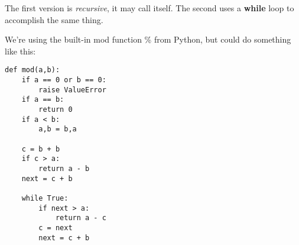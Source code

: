 \documentclass[11pt, oneside]{article}
\begin{document}
The first version is \emph{recursive}, it may call itself.  The second uses a \textbf{while} loop to accomplish the same thing.

We're using the built-in mod function \% from Python, but could do something like this:

\begin{verbatim}
def mod(a,b):
    if a == 0 or b == 0:
        raise ValueError
    if a == b:
        return 0
    if a < b:
        a,b = b,a

    c = b + b
    if c > a:
        return a - b
    next = c + b
    
    while True:
        if next > a:
            return a - c
        c = next
        next = c + b
        
\end{verbatim}
\end{document}
